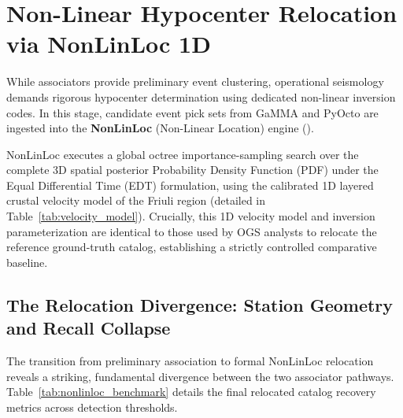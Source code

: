 \section{Non-Linear Hypocenter Relocation via NonLinLoc 1D}
\label{sec:nonlinloc_relocation}

While associators provide preliminary event clustering, operational seismology demands rigorous hypocenter determination using dedicated non-linear inversion codes. In this stage, candidate event pick sets from GaMMA and PyOcto are ingested into the \textbf{NonLinLoc} (Non-Linear Location) engine (\cite{NonLinLoc}).

NonLinLoc executes a global octree importance-sampling search over the complete 3D spatial posterior Probability Density Function (PDF) under the Equal Differential Time (\ac{EDT}) formulation, using the calibrated 1D layered crustal velocity model of the Friuli region (detailed in Table~\ref{tab:velocity_model}). Crucially, this 1D velocity model and inversion parameterization are identical to those used by OGS analysts to relocate the reference ground-truth catalog, establishing a strictly controlled comparative baseline.

\subsection{The Relocation Divergence: Station Geometry and Recall Collapse}
\label{subsec:relocation_divergence}

The transition from preliminary association to formal NonLinLoc relocation reveals a striking, fundamental divergence between the two associator pathways. Table~\ref{tab:nonlinloc_benchmark} details the final relocated catalog recovery metrics across detection thresholds.

